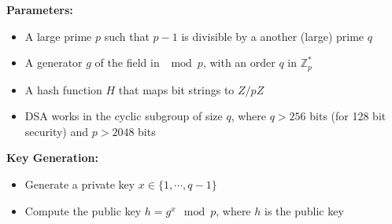 \textbf{Parameters:}
\begin{itemize}
    \item A large prime $p$ such that $p-1$ is divisible by a another (large) prime $q$
    \item A generator $g$ of the field in $\mod p$, with an order $q$ in $\mathbb{Z}_p^*$
    \item A hash function $H$ that maps bit strings to $Z/pZ$
    \item DSA works in the cyclic subgroup of size $q$, where $q > 256$ bits (for 128 bit security) and $p > 2048$ bits
\end{itemize}

\textbf{Key Generation:}
\begin{itemize}
    \item Generate a private key $x \in \{1, \cdots, q-1\}$
    \item Compute the public key $h = g^x \mod p$, where $h$ is the public key
\end{itemize}

